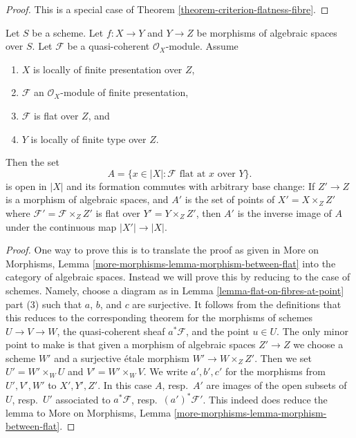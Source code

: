 \begin{proof}
This is a special case of
Theorem \ref{theorem-criterion-flatness-fibre}.
\end{proof}

\begin{lemma}
\label{lemma-base-change-criterion-flatness-fibre}
Let $S$ be a scheme. Let $f : X \to Y$ and $Y \to Z$ be morphisms of
algebraic spaces over $S$. Let $\mathcal{F}$ be a quasi-coherent
$\mathcal{O}_X$-module.
Assume
\begin{enumerate}
\item $X$ is locally of finite presentation over $Z$,
\item $\mathcal{F}$ an $\mathcal{O}_X$-module of finite presentation,
\item $\mathcal{F}$ is flat over $Z$, and
\item $Y$ is locally of finite type over $Z$.
\end{enumerate}
Then the set
$$
A = \{x \in |X| : \mathcal{F} \text{ flat at }x \text{ over }Y\}.
$$
is open in $|X|$ and its formation commutes with arbitrary base change:
If $Z' \to Z$ is a morphism of algebraic spaces, and $A'$ is the set of
points of $X' = X \times_Z Z'$ where $\mathcal{F}' = \mathcal{F} \times_Z Z'$
is flat over $Y' = Y \times_Z Z'$, then $A'$ is the inverse image of
$A$ under the continuous map $|X'| \to |X|$.
\end{lemma}

\begin{proof}
One way to prove this is to translate the proof as given in
More on Morphisms, Lemma \ref{more-morphisms-lemma-morphism-between-flat}
into the category of algebraic spaces. Instead we will prove this
by reducing to the case of schemes. Namely, choose a diagram as in
Lemma \ref{lemma-flat-on-fibres-at-point} part (3)
such that $a$, $b$, and $c$ are surjective.
It follows from the definitions that this reduces to the
corresponding theorem for the morphisms of schemes
$U \to V \to W$, the quasi-coherent sheaf $a^*\mathcal{F}$,
and the point $u \in U$. The only minor point to make is that
given a morphism of algebraic spaces $Z' \to Z$ we choose a scheme
$W'$ and a surjective \'etale morphism $W' \to W \times_Z Z'$.
Then we set $U' = W' \times_W U$ and $V' = W' \times_W V$.
We write $a', b', c'$ for the morphisms from $U', V', W'$ to
$X', Y', Z'$. In this case $A$, resp.\ $A'$ are images of the open
subsets of $U$, resp.\ $U'$ associated to
$a^*\mathcal{F}$, resp.\ $(a')^*\mathcal{F}'$.
This indeed does reduce the lemma to
More on Morphisms, Lemma \ref{more-morphisms-lemma-morphism-between-flat}.
\end{proof}

